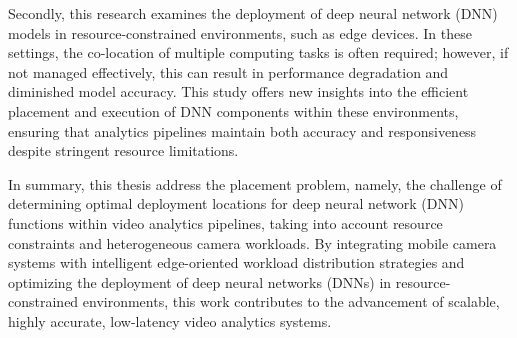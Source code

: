 Secondly, this research examines the deployment of deep neural network (DNN) models in resource-constrained environments, such as edge devices. In these settings, the co-location of multiple computing tasks is often required; however, if not managed effectively, this can result in performance degradation and diminished model accuracy. This study offers new insights into the efficient placement and execution of DNN components within these environments, ensuring that analytics pipelines maintain both accuracy and responsiveness despite stringent resource limitations.

In summary, this thesis address the placement problem, namely, the challenge of determining optimal deployment locations for deep neural network (DNN) functions within video analytics pipelines, taking into account resource constraints and heterogeneous camera workloads. By integrating mobile camera systems with intelligent edge-oriented workload distribution strategies and optimizing the deployment of deep neural networks (DNNs) in resource-constrained environments, this work contributes to the advancement of scalable, highly accurate, low-latency video analytics systems.






